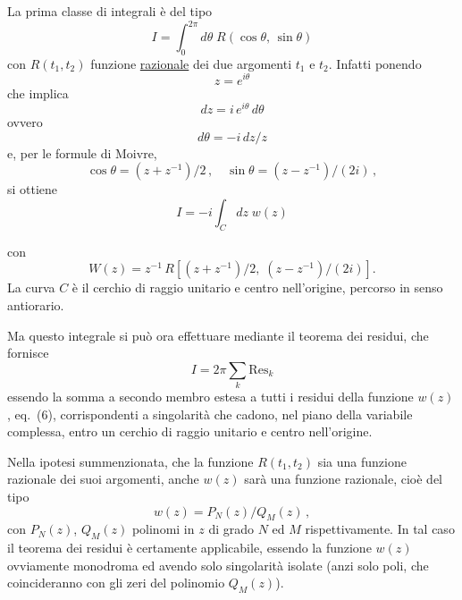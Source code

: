 \documentclass[11pt, a4paper]{book}
\numberwithin{equation}{section}
\begin{document}
La prima classe di integrali è del tipo
\begin{equation}
I = \int_0^{2\pi} d\theta\; R(\cos\theta,\, \sin\theta) \tag{1}
\end{equation}
con $R(t_1, t_2)$ funzione \uline{razionale} dei due argomenti $t_1$ e $t_2$. Infatti ponendo
\begin{equation}
z = e^{i\theta} \tag{2}
\end{equation}
che implica
\begin{equation}
dz = i\,e^{i\theta}\,d\theta \tag{3a}
\end{equation}
ovvero
\begin{equation}
d\theta = -i\,dz/z \tag{3b}
\end{equation}
e, per le formule di Moivre,
\begin{equation}
\cos\theta = (z+z^{-1})/2\,, \quad \sin\theta = (z-z^{-1})/(2i)\,, \tag{4}
\end{equation}
si ottiene
\begin{equation}
I = -i \int_C dz\; w(z) \tag{5}
\end{equation}

con
\begin{equation}
W(z) = z^{-1}\, R\!\left[(z+z^{-1})/2,\; (z-z^{-1})/(2i)\right]. \tag{6}
\end{equation}
La curva $C$ è il cerchio di raggio unitario e centro nell'origine, percorso in senso antiorario.

Ma questo integrale si può ora effettuare mediante il teorema dei residui, che fornisce
\begin{equation}
I = 2\pi \sum_k \mathrm{Res}_k \tag{7}
\end{equation}
essendo la somma a secondo membro estesa a tutti i residui della funzione $w(z)$, eq.\ (6), corrispondenti a singolarità che cadono, nel piano della variabile complessa, entro un cerchio di raggio unitario e centro nell'origine.

Nella ipotesi summenzionata, che la funzione $R(t_1, t_2)$ sia una funzione razionale dei suoi argomenti, anche $w(z)$ sarà una funzione razionale, cioè del tipo
\begin{equation}
w(z) = P_N(z) \big/ Q_M(z)\,, \tag{8}
\end{equation}
con $P_N(z)$, $Q_M(z)$ polinomi in $z$ di grado $N$ ed $M$ rispettivamente. In tal caso il teorema dei residui è certamente applicabile, essendo la funzione $w(z)$ ovviamente monodroma ed avendo solo singolarità isolate (anzi solo poli, che coincideranno con gli zeri del polinomio $Q_M(z)$).
\end{document}
